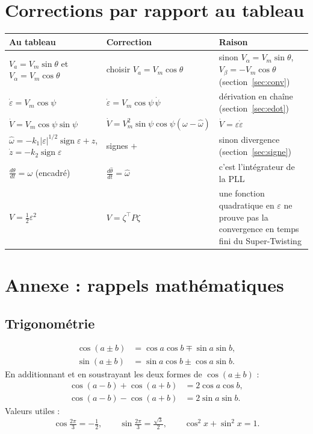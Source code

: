 \documentclass[11pt,a4paper]{article}
\numberwithin{equation}{section}
\theoremstyle{plain}
\theoremstyle{definition}
\theoremstyle{remark}
\newcommand{\sign}{\operatorname{sign}}
\newcommand{\hth}{\hat{\theta}}
\newcommand{\hw}{\hat{\omega}}
\begin{document}
\section{Corrections par rapport au tableau}
\begin{center}
\renewcommand{\arraystretch}{1.35}
\begin{tabular}{|p{4.2cm}|p{4.6cm}|p{5.2cm}|}
\hline
\textbf{Au tableau} & \textbf{Correction} & \textbf{Raison}\\
\hline
$V_a = V_m\sin\theta$ et $V_\alpha=V_m\cos\theta$ & choisir $V_a=V_m\cos\theta$ & sinon $V_\alpha=V_m\sin\theta$, $V_\beta=-V_m\cos\theta$ (section~\ref{sec:conv})\\
\hline
$\dot\varepsilon = V_m\cos\psi$ & $\dot\varepsilon = V_m\cos\psi\,\dot\psi$ & dérivation en chaîne (section~\ref{sec:edot})\\
\hline
$\dot V = V_m\cos\psi\sin\psi$ & $\dot V = V_m^2\sin\psi\cos\psi(\omega-\hw)$ & $\dot V=\varepsilon\dot\varepsilon$\\
\hline
$\hw = -k_1|\varepsilon|^{1/2}\sign\varepsilon + z$, $\dot z=-k_2\sign\varepsilon$ & signes $+$ & sinon divergence (section~\ref{sec:signe})\\
\hline
$\frac{d\theta}{dt}=\omega$ (encadré) & $\frac{d\hth}{dt}=\hw$ & c'est l'intégrateur de la PLL\\
\hline
$V=\frac12\varepsilon^2$ & $V=\zeta^\top P\zeta$ & une fonction quadratique en $\varepsilon$ ne prouve pas la convergence en temps fini du Super-Twisting\\
\hline
\end{tabular}
\end{center}

\appendix
\section{Annexe : rappels mathématiques}\label{sec:annexe}
\setcounter{equation}{0}
\renewcommand{\theequation}{A.\arabic{equation}}

\subsection*{Trigonométrie}
\begin{align}
\cos(a\pm b) &= \cos a\cos b\mp\sin a\sin b,\\
\sin(a\pm b) &= \sin a\cos b\pm\cos a\sin b .\label{A:sin}
\end{align}
En additionnant et en soustrayant les deux formes de $\cos(a\pm b)$ :
\begin{align}
\cos(a-b)+\cos(a+b) &= 2\cos a\cos b,\label{A:sum}\\
\cos(a-b)-\cos(a+b) &= 2\sin a\sin b .\label{A:diff}
\end{align}
Valeurs utiles :
\begin{equation}
\cos\tfrac{2\pi}{3} = -\tfrac12,\qquad \sin\tfrac{2\pi}{3} = \tfrac{\sqrt3}{2},\qquad \cos^2x+\sin^2x=1 .
\end{equation}
\end{document}
